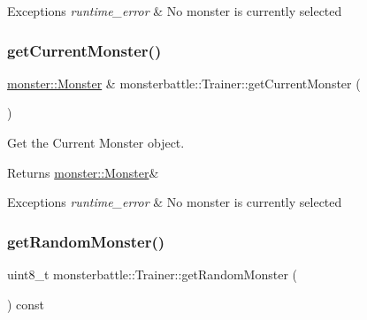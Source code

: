 \begin{DoxyExceptions}{Exceptions}
{\em runtime\+\_\+error} & No monster is currently selected \\
\hline
\end{DoxyExceptions}
\mbox{\label{classmonsterbattle_1_1Trainer_aac07b46ed5e8ddb91462b875e59fb2c9}} 
\subsubsection{\texorpdfstring{get\+Current\+Monster()}{getCurrentMonster()}}
{\footnotesize\ttfamily \hyperlink{classmonsterbattle_1_1monster_1_1Monster}{monster\+::\+Monster} \& monsterbattle\+::\+Trainer\+::get\+Current\+Monster (\begin{DoxyParamCaption}{ }\end{DoxyParamCaption})}



Get the Current Monster object. 

\begin{DoxyReturn}{Returns}
\hyperlink{classmonsterbattle_1_1monster_1_1Monster}{monster\+::\+Monster}\&
\end{DoxyReturn}

\begin{DoxyExceptions}{Exceptions}
{\em runtime\+\_\+error} & No monster is currently selected \\
\hline
\end{DoxyExceptions}
\mbox{\label{classmonsterbattle_1_1Trainer_a6e369b2d164e3c1040add317848fed6b}} 
\subsubsection{\texorpdfstring{get\+Random\+Monster()}{getRandomMonster()}}
{\footnotesize\ttfamily uint8\+\_\+t monsterbattle\+::\+Trainer\+::get\+Random\+Monster (\begin{DoxyParamCaption}{ }\end{DoxyParamCaption}) const}



